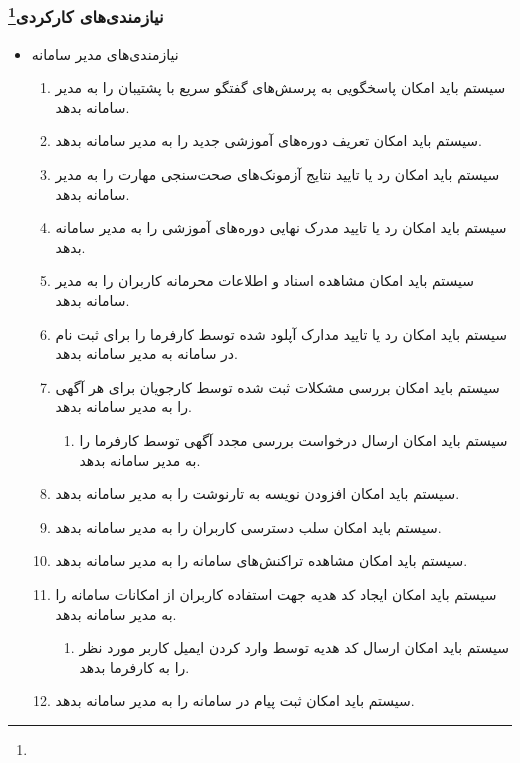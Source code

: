 \documentclass[12pt]{article}
\begin{document}
	\subsubsection{نیازمندی‌های کارکردی\footnote{}}
	\begin{itemize}
		\item
		نیازمندی‌های مدیر سامانه
		\begin{enumerate}
			\renewcommand{\labelenumi}{-R\arabic{enumi}}
			\item سیستم باید امکان پاسخگویی به پرسش‌های گفتگو سریع با پشتیبان را به مدیر سامانه بدهد.
			\item سیستم باید امکان تعریف دوره‌های آموزشی جدید را به مدیر سامانه بدهد.
			\item سیستم باید امکان رد یا تایید نتایج آزمونک‌های صحت‌سنجی مهارت را به مدیر سامانه بدهد.
			\item سیستم باید امکان رد یا تایید مدرک نهایی دوره‌های آموزشی را به مدیر سامانه بدهد.
			\item سیستم باید امکان مشاهده اسناد و اطلاعات محرمانه کاربران را به مدیر سامانه بدهد.
			\item سیستم باید امکان رد یا تایید مدارک آپلود شده توسط کارفرما را برای ثبت نام در سامانه به مدیر سامانه بدهد.
			\item سیستم باید امکان بررسی مشکلات ثبت شده توسط کارجویان برای هر آگهی را به مدیر سامانه بدهد.
			\begin{enumerate}
				\renewcommand{\labelenumii}{-R\arabic{enumi}.\arabic{enumii}}
				\item سیستم باید امکان ارسال درخواست بررسی مجدد آگهی توسط کارفرما را به مدیر سامانه بدهد.
			\end{enumerate}
			\item سیستم باید امکان افزودن نویسه به تارنوشت را به مدیر سامانه بدهد.
			\item سیستم باید امکان سلب دسترسی کاربران را به مدیر سامانه بدهد.
			\item سیستم باید امکان مشاهده تراکنش‌های سامانه را به مدیر سامانه بدهد.
			\item سیستم باید امکان ایجاد کد هدیه جهت استفاده کاربران از امکانات سامانه را به مدیر سامانه بدهد.
			\begin{enumerate}
				\renewcommand{\labelenumii}{-R\arabic{enumi}.\arabic{enumii}}
				\item سیستم باید امکان ارسال کد هدیه توسط وارد کردن ایمیل کاربر مورد نظر را به کارفرما بدهد.
			\end{enumerate}
			\item سیستم باید امکان ثبت پیام در سامانه را به مدیر سامانه بدهد.

\end{enumerate}
\end{itemize}
\end{document}

